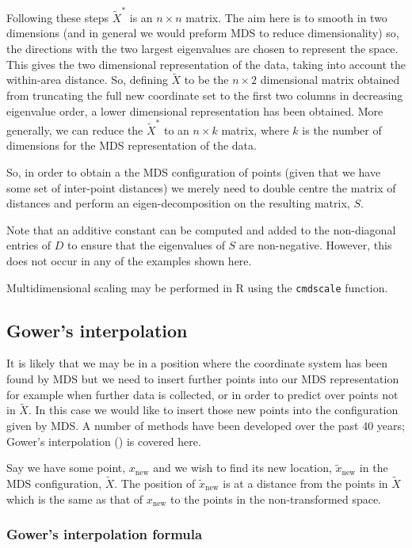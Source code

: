 \documentclass[a4paper,10pt]{article}
\newcommand{\cross}{\times}
\begin{document}
Following these steps $\tilde{X}^*$ is an $n \cross n$ matrix. The aim here is to smooth in two dimensions (and in general we would preform MDS to reduce dimensionality) so, the directions with the two largest eigenvalues are chosen to represent the space. This gives the two dimensional representation of the data, taking into account the within-area distance. So, defining $\tilde{X}$ to be the $n \cross 2$ dimensional matrix obtained from truncating the full new coordinate set to the first two columns in decreasing eigenvalue order, a lower dimensional representation has been obtained. More generally, we can reduce the $\tilde{X}^*$ to an $n \cross k$ matrix, where $k$ is the number of dimensions for the MDS representation of the data.

So, in order to obtain a the MDS configuration of points (given that we have some set of inter-point distances) we merely need to double centre the matrix of distances and perform an eigen-decomposition on the resulting matrix, $S$. 

Note that an additive constant can be computed and added to the non-diagonal entries of $D$ to ensure that the eigenvalues of $S$ are non-negative. However, this does not occur in any of the examples shown here.

Multidimensional scaling may be performed in \textsf{R} using the \texttt{cmdscale} function. 

\subsection{Gower's interpolation} 

It is likely that we may be in a position where the coordinate system has been found by MDS but we need to insert further points into our MDS representation for example when further data is collected, or in order to predict over points not in $\tilde{X}$. In this case we would like to insert those new points into the configuration given by MDS. A number of methods have been developed over the past 40 years; Gower's interpolation (\cite{gower1968}) is covered here.

Say we have some point, $x_{\text{new}}$ and we wish to find its new location, $\tilde{x}_{\text{new}}$ in the MDS configuration, $\tilde{X}$. The position of $\tilde{x}_{\text{new}}$ is at a distance from the points in $\tilde{X}$ which is the same as that of $x_{\text{new}}$ to the points in the non-transformed space.

\subsubsection{Gower's interpolation formula}
\end{document}
